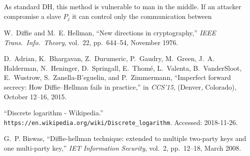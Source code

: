 \documentclass[11pt]{article}
\begin{document}
As standard DH, this method is vulnerable to man in the middle. If an attacker compromise a slave $P_j$ it can control only the communication between 

\vfill

\begin{thebibliography}{99}

W.~Diffie and M.~E. Hellman, ``New directions in cryptography,'' {\em IEEE
  Trans.\ Info.\ Theory}, vol.~22, pp.~644--54, November 1976.

D.~Adrian, K.~Bhargavan, Z.~Durumeric, P.~Gaudry, M.~Green, J.~A. Halderman,
  N.~Heninger, D.~Springall, E.~Thom\'{e}, L.~Valenta, B.~VanderSloot,
  E.~Wustrow, S.~Zanella-B'{e}guelin, and P.~Zimmermann, ``Imperfect forward
  secrecy: How {Diffie--Hellman} fails in practice,'' in {\em CCS'15}, (Denver,
  Colorado), October 12--16, 2015.

``{Discrete logarithm - Wikipedia}.'' \verb|https://en.wikipedia.org/wiki/Discrete_logarithm|.
\newblock Accessed: 2018-11-26.

G.~P. Biswas, ``Diffie-hellman technique: extended to multiple two-party keys
  and one multi-party key,'' {\em IET Information Security}, vol.~2,
  pp.~12--18, March 2008.


\end{thebibliography}
\end{document}
